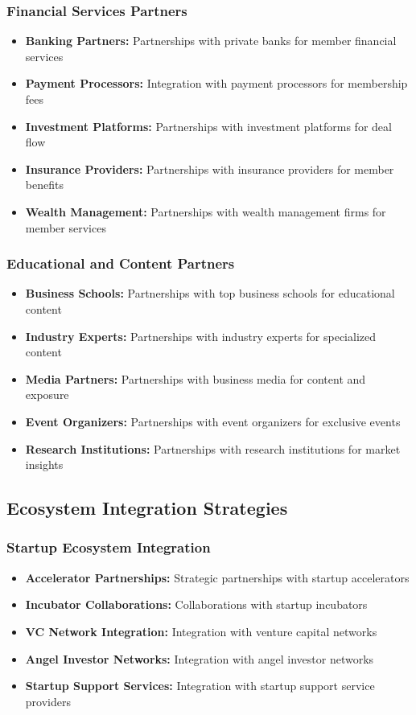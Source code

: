 \subsubsection{Financial Services Partners}
\begin{itemize}
    \item \textbf{Banking Partners:} Partnerships with private banks for member financial services
    \item \textbf{Payment Processors:} Integration with payment processors for membership fees
    \item \textbf{Investment Platforms:} Partnerships with investment platforms for deal flow
    \item \textbf{Insurance Providers:} Partnerships with insurance providers for member benefits
    \item \textbf{Wealth Management:} Partnerships with wealth management firms for member services
\end{itemize}

\subsubsection{Educational and Content Partners}
\begin{itemize}
    \item \textbf{Business Schools:} Partnerships with top business schools for educational content
    \item \textbf{Industry Experts:} Partnerships with industry experts for specialized content
    \item \textbf{Media Partners:} Partnerships with business media for content and exposure
    \item \textbf{Event Organizers:} Partnerships with event organizers for exclusive events
    \item \textbf{Research Institutions:} Partnerships with research institutions for market insights
\end{itemize}

\subsection{Ecosystem Integration Strategies}

\subsubsection{Startup Ecosystem Integration}
\begin{itemize}
    \item \textbf{Accelerator Partnerships:} Strategic partnerships with startup accelerators
    \item \textbf{Incubator Collaborations:} Collaborations with startup incubators
    \item \textbf{VC Network Integration:} Integration with venture capital networks
    \item \textbf{Angel Investor Networks:} Integration with angel investor networks
    \item \textbf{Startup Support Services:} Integration with startup support service providers
\end{itemize}

